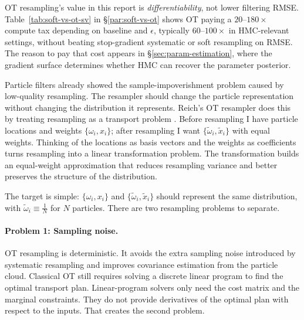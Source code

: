 \documentclass{article}
\begin{document}
OT resampling's value in this report is \emph{differentiability}, not lower filtering RMSE. Table~\ref{tab:soft-vs-ot-sv} in \S\ref{par:soft-vs-ot} shows OT paying a $20$--$180\times$ compute tax depending on baseline and $\epsilon$, typically $60$--$100\times$ in HMC-relevant settings, without beating stop-gradient systematic or soft resampling on RMSE. The reason to pay that cost appears in \S\ref{sec:param-estimation}, where the gradient surface determines whether HMC can recover the parameter posterior.

Particle filters already showed the sample-impoverishment problem caused by low-quality resampling. The resampler should change the particle representation without changing the distribution it represents. Reich's OT resampler does this by treating resampling as a transport problem \cite{reich2013nonparametric}. Before resampling I have particle locations and weights $\{\omega_i, x_i\}$; after resampling I want $\{\tilde\omega_i, \tilde x_i\}$ with equal weights. Thinking of the locations as basis vectors and the weights as coefficients turns resampling into a linear transformation problem. The transformation builds an equal-weight approximation that reduces resampling variance and better preserves the structure of the distribution.

The target is simple: $\{\omega_i, x_i\}$ and $\{\tilde\omega_i, \tilde x_i\}$ should represent the same distribution, with $\tilde\omega_i \equiv \frac1N$ for $N$ particles. There are two resampling problems to separate.

\paragraph{Problem 1: Sampling noise.} OT resampling is deterministic. It avoids the extra sampling noise introduced by systematic resampling and improves covariance estimation from the particle cloud. Classical OT still requires solving a discrete linear program to find the optimal transport plan. Linear-program solvers only need the cost matrix and the marginal constraints. They do not provide derivatives of the optimal plan with respect to the inputs. That creates the second problem.
\end{document}
